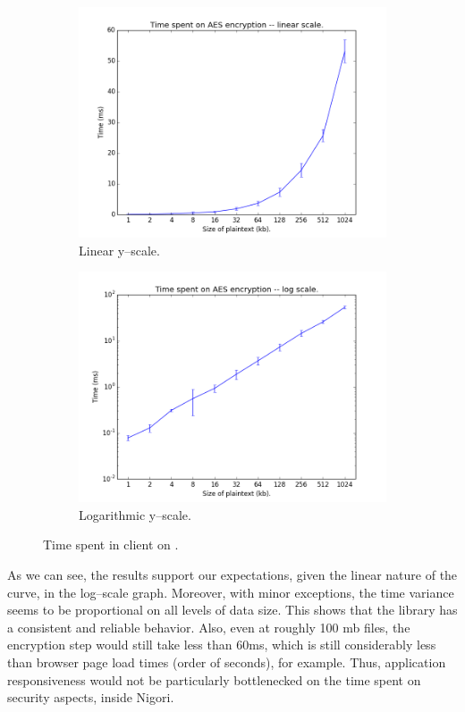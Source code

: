 \begin{figure}
\centering
\begin{subfigure}{.5\textwidth}
  \centering
  \includegraphics[width=1.1\linewidth]{images/aes_linear}
  \caption{Linear y--scale.}
\end{subfigure}%
\begin{subfigure}{.5\textwidth}
  \centering
  \includegraphics[width=1.1\linewidth]{images/aes_log}
  \caption{Logarithmic y--scale.}
\end{subfigure}
\caption{Time spent in client on .}
\label{fig:aes}
\end{figure}

As we can see, the results support our expectations, given the linear nature of the curve, in the log--scale graph.
Moreover, with minor exceptions, the time variance seems to be proportional on all levels of data size.
This shows that the library has a consistent and reliable behavior.
Also, even at roughly 100 mb files, the encryption step would still take less than 60ms, which is still considerably less than browser page load times (order of seconds), for example.
Thus, application responsiveness would not be particularly bottlenecked on the time spent on security aspects, inside Nigori.
